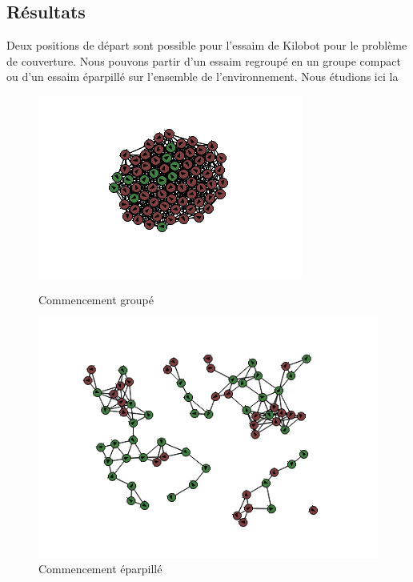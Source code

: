 \documentclass[a4paper]{article}
\begin{document}
\subsection{Résultats}
Deux positions de départ sont possible pour l'essaim de Kilobot pour le problème de couverture. Nous pouvons partir d'un essaim regroupé en un groupe compact ou d'un essaim éparpillé sur l'ensemble de l'environnement.
Nous étudions ici la 
\begin{figure}[h]
	\begin{minipage}[c]{.46\linewidth}
		\centering
		\includegraphics[width=1.1\linewidth]{../../script_results/start_groupe.png}
		\caption{Commencement groupé}
	\end{minipage}
	\hfill%
	\begin{minipage}[c]{.46\linewidth}
		\centering
		\includegraphics[width=1.1\linewidth]{../../script_results/start_eparpille.png}
		\caption{Commencement éparpillé}
	\end{minipage}
\end{figure}
\end{document}
